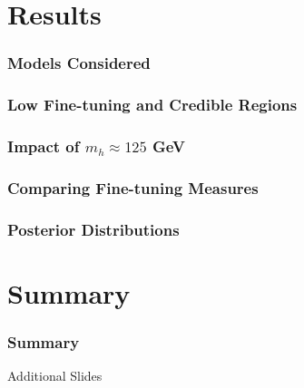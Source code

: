 \documentclass[10pt,aspectratio=169]{beamer}
\begin{document}
\section{Results}

\begin{frame}
  \frametitle{Models Considered}
\end{frame}

\begin{frame}
  \frametitle{Low Fine-tuning and Credible Regions}
\end{frame}

\begin{frame}
  \frametitle{Impact of $m_h \approx 125$ GeV}
\end{frame}

\begin{frame}
  \frametitle{Comparing Fine-tuning Measures}
\end{frame}

\begin{frame}
  \frametitle{Posterior Distributions}
\end{frame}

\section{Summary}

\begin{frame}
  \frametitle{Summary}
\end{frame}

\appendix

\begin{frame}
  \begin{center}
    {
      \Large
      Additional Slides
    }
  \end{center}
\end{frame}
\end{document}
